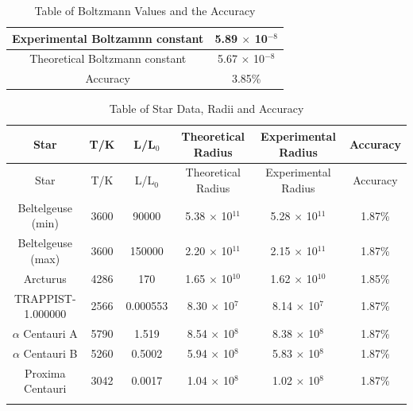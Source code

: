 \documentclass[12pt, a4paper]{article}
\begin{document}
\begin{table}[H]
    \centering
    \begin{tabular}{|c|c|}
        \hline 
        Experimental Boltzamnn constant & 5.89 \(\times\) 10\(^{-8}\) \\ \hline
        Theoretical Boltzmann constant & 5.67 \(\times\) 10\(^{-8}\) \\ \hline
        Accuracy & 3.85\% \\ \hline
    \end{tabular}
    \caption{Table of Boltzmann Values and the Accuracy}
    \label{Tab: Table 2.2}
\end{table}

\begin{longtable}{|c|c|c|c|c|c|}
    \hline Star & T/K & L/L\(_0\) & Theoretical Radius & Experimental Radius & Accuracy\\ \hline
    \endfirsthead

    \hline Star & T/K & L/L\(_0\) & Theoretical Radius & Experimental Radius & Accuracy\\ \hline
    \endhead

    Beltelgeuse (min) & 3600 & 90000 & 5.38 \(\times\) 10\(^{11}\) & 5.28 \(\times\) 10\(^{11}\) & 1.87\%\\ \hline
    Beltelgeuse (max) & 3600 & 150000 & 2.20 \(\times\) 10\(^{11}\) & 2.15 \(\times\) 10\(^{11}\) & 1.87\%\\ \hline
    Arcturus & 4286 & 170 & 1.65 \(\times\) 10\(^{10}\) & 1.62 \(\times\) 10\(^{10}\) & 1.85\%\\ \hline
    TRAPPIST-1.000000 & 2566 & 0.000553 & 8.30 \(\times\) 10\(^{7}\) & 8.14 \(\times\) 10\(^{7}\) & 1.87\%\\ \hline
    \(\alpha\) Centauri A  & 5790 & 1.519 & 8.54 \(\times\) 10\(^{8}\) & 8.38 \(\times\) 10\(^{8}\) & 1.87\%\\ \hline
    \(\alpha\) Centauri B  & 5260 & 0.5002 & 5.94 \(\times\) 10\(^{8}\) & 5.83 \(\times\) 10\(^{8}\) & 1.87\%\\ \hline
    Proxima Centauri & 3042 & 0.0017 & 1.04 \(\times\) 10\(^{8}\) & 1.02 \(\times\) 10\(^{8}\) & 1.87\%\\ \hline

    \caption{Table of Star Data, Radii and Accuracy}
    \label{Tab: Table 2.3}\\
\end{longtable}
\end{document}
